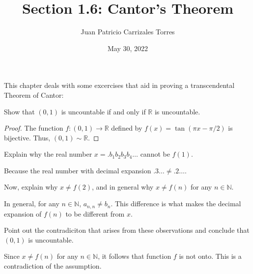 \documentclass[12pt]{article}
\newcommand{\N}{\mathbb{N}}
\newcommand{\R}{\mathbb{R}}
\newenvironment{problem}[2][Problem]{\begin{trivlist} \item[\hskip \labelsep {\bfseries #1}\hskip \labelsep {\bfseries #2.}]}{\end{trivlist}}
\newenvironment{solution}[2][Solution]{\begin{trivlist} \item[\hskip \labelsep {\bfseries #1}\hskip \labelsep {\bfseries #2.}]}{\end{trivlist}}
\begin{document}
  
\title{Section 1.6: Cantor's Theorem}
   \author{Juan Patricio Carrizales Torres}
     \date{May 30, 2022}
       \maketitle
	
This chapter deals with some excercises that aid in proving a transcendental Theorem of Cantor:

\begin{problem}{1.6.1}
  Show that $(0,1)$ is uncountable if and only if $\R$ is uncountable. 
  \begin{proof}
    The function $f:(0,1) \to \R$ defined by $f(x) = \tan\left(\pi x - \pi/2 \right)$ is bijective. Thus, $(0,1)\sim \R$. 
  \end{proof}
\end{problem}

\begin{problem}{1.6.2}
  \begin{enumerate}[label=(\alph*)]
    \item Explain why the real number $x=.b_{1}b_{2}b_{3}b_{4}\dots$ cannot be $f(1)$.
      \begin{solution}{(a)}
	Because the real number with decimal expansion $.3\dots \neq .2\dots$.
      \end{solution}
    \item Now, explain why $x\neq f(2)$, and in general why $x\neq f(n)$ for any $n\in \N$. 
      \begin{solution}{(b)}
	In general, for any $n\in \N$, $a_{n,n} \neq b_{n}$. This difference is what makes the decimal expansion of $f(n)$ to be different from $x$. 
      \end{solution}

    \item Point out the contradiciton that arises from these observations and conclude that $(0,1)$ is uncountable.
      \begin{solution}{(c)}
	Since $x\neq f(n)$ for any $n\in \N$, it follows that function $f$ is not onto. This is a contradiction of the assumption. 
      \end{solution}
  \end{enumerate}
\end{problem}
\end{document}
